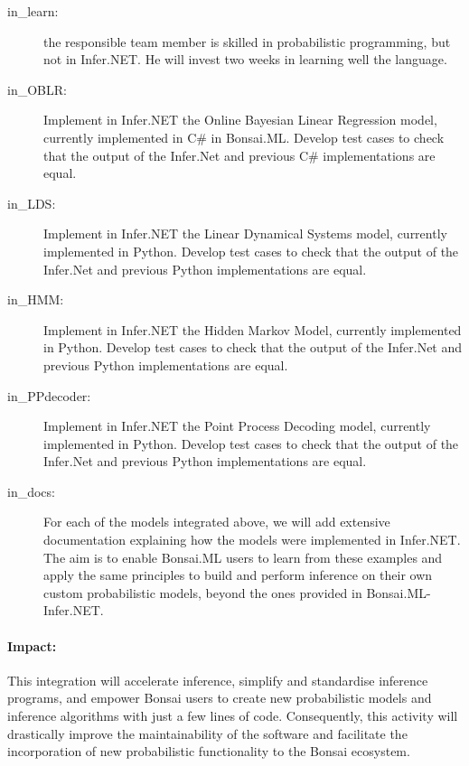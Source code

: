\begin{description}

    \item[in\_learn:] the responsible team member is skilled in probabilistic
        programming, but not in Infer.NET. He will invest two weeks in learning
        well the language.

    \item[in\_OBLR:]  Implement in Infer.NET the Online Bayesian Linear
        Regression model, currently implemented in C\# in Bonsai.ML. Develop
        test cases to check that the output of the Infer.Net and previous C\#
        implementations are equal.

    \item[in\_LDS:] Implement in Infer.NET the Linear Dynamical Systems model,
        currently implemented in Python. Develop test cases to check that the
        output of the Infer.Net and previous Python implementations are equal.

    \item[in\_HMM:] Implement in Infer.NET the Hidden Markov Model, currently
        implemented in Python. Develop test cases to check that the output of
        the Infer.Net and previous Python implementations are equal.

    \item[in\_PPdecoder:] Implement in Infer.NET the Point Process Decoding
        model, currently implemented in Python. Develop test cases to check
        that the output of the Infer.Net and previous Python implementations
        are equal.

    \item[in\_docs:] For each of the models integrated above, we will add
        extensive documentation explaining how the models were implemented in
        Infer.NET. The aim is to enable Bonsai.ML users to learn from these
        examples and apply the same principles to build and perform inference
        on their own custom probabilistic models, beyond the ones provided in
        Bonsai.ML-Infer.NET.

\end{description}

\paragraph{Impact:}
This integration will accelerate
inference, simplify and standardise inference programs, and empower Bonsai
users to create new probabilistic models and inference algorithms with just a
few lines of code. Consequently, this activity will drastically improve the
maintainability of the software and facilitate the incorporation of new
probabilistic functionality to the Bonsai ecosystem.

